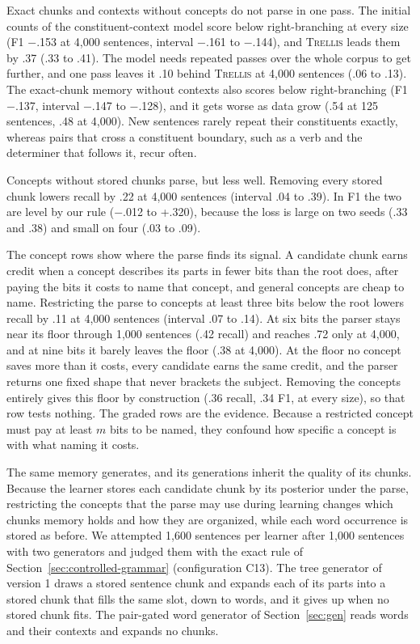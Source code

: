 \documentclass[11pt,letterpaper]{article}
\newcommand{\trellis}{\textsc{Trellis}}
\begin{document}
Exact chunks and contexts without concepts do not parse in one pass. The initial counts of the constituent-context model score below right-branching at every size (F1 $-$.153 at 4,000 sentences, interval $-$.161 to $-$.144), and \trellis{} leads them by .37 (.33 to .41).
The model needs repeated passes over the whole corpus to get further, and one pass leaves it .10 behind \trellis{} at 4,000 sentences (.06 to .13).
The exact-chunk memory without contexts also scores below right-branching (F1 $-$.137, interval $-$.147 to $-$.128), and it gets worse as data grow (.54 at 125 sentences, .48 at 4,000).
New sentences rarely repeat their constituents exactly, whereas pairs that cross a constituent boundary, such as a verb and the determiner that follows it, recur often.

Concepts without stored chunks parse, but less well. Removing every stored chunk lowers recall by .22 at 4,000 sentences (interval .04 to .39). In F1 the two are level by our rule ($-$.012 to +.320), because the loss is large on two seeds (.33 and .38) and small on four (.03 to .09).

The concept rows show where the parse finds its signal. A candidate chunk earns credit when a concept describes its parts in fewer bits than the root does, after paying the bits it costs to name that concept, and general concepts are cheap to name.
Restricting the parse to concepts at least three bits below the root lowers recall by .11 at 4,000 sentences (interval .07 to .14). At six bits the parser stays near its floor through 1,000 sentences (.42 recall) and reaches .72 only at 4,000, and at nine bits it barely leaves the floor (.38 at 4,000).
At the floor no concept saves more than it costs, every candidate earns the same credit, and the parser returns one fixed shape that never brackets the subject. Removing the concepts entirely gives this floor by construction (.36 recall, .34 F1, at every size), so that row tests nothing. The graded rows are the evidence. Because a restricted concept must pay at least $m$ bits to be named, they confound how specific a concept is with what naming it costs.

The same memory generates, and its generations inherit the quality of its chunks. Because the learner stores each candidate chunk by its posterior under the parse, restricting the concepts that the parse may use during learning changes which chunks memory holds and how they are organized, while each word occurrence is stored as before.
We attempted 1,600 sentences per learner after 1,000 sentences with two generators and judged them with the exact rule of Section~\ref{sec:controlled-grammar} (configuration C13).
The tree generator of version 1 draws a stored sentence chunk and expands each of its parts into a stored chunk that fills the same slot, down to words, and it gives up when no stored chunk fits. The pair-gated word generator of Section~\ref{sec:gen} reads words and their contexts and expands no chunks.
\end{document}

